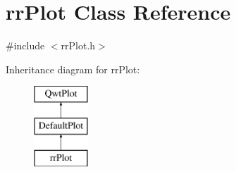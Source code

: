 \hypertarget{classrr_plot}{\section{rr\+Plot Class Reference}
\label{classrr_plot}
}


{\ttfamily \#include $<$rr\+Plot.\+h$>$}

Inheritance diagram for rr\+Plot\+:\begin{figure}[H]
\begin{center}
\leavevmode
\includegraphics[height=3.000000cm]{classrr_plot}
\end{center}
\end{figure}
